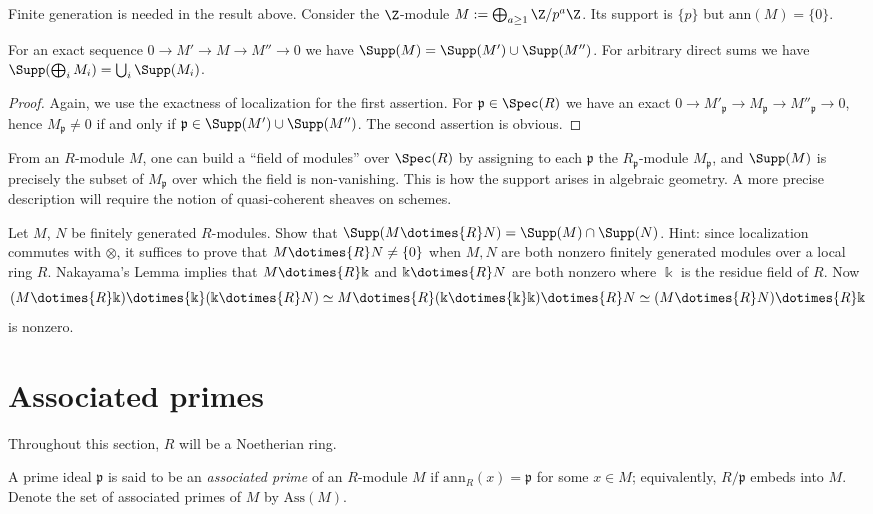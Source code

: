 Finite generation is needed in the result above. Consider the $\Z$-module $M := \bigoplus_{a \geq 1} \Z/p^a \Z$. Its support is $\{p\}$ but $\mathrm{ann}(M) = \{0\}$.

\begin{proposition}
	For an exact sequence $0 \to M' \to M \to M'' \to 0$ we have $\Supp(M) = \Supp(M') \cup \Supp(M'')$. For arbitrary direct sums we have $\Supp(\bigoplus_i M_i) = \bigcup_i \Supp(M_i)$.
\end{proposition}
\begin{proof}
	Again, we use the exactness of localization for the first assertion. For $\mathfrak{p} \in \Spec(R)$ we have an exact $0 \to M'_{\mathfrak{p}} \to M_{\mathfrak{p}} \to M''_{\mathfrak{p}} \to 0$, hence $M_{\mathfrak{p}} \neq 0$ if and only if $\mathfrak{p} \in \Supp(M') \cup \Supp(M'')$. The second assertion is obvious.
\end{proof}

From an $R$-module $M$, one can build a ``field of modules'' over $\Spec(R)$ by assigning to each $\mathfrak{p}$ the $R_{\mathfrak{p}}$-module $M_{\mathfrak{p}}$, and $\Supp(M)$ is precisely the subset of $M_{\mathfrak{p}}$ over which the field is non-vanishing. This is how the support arises in algebraic geometry. A more precise description will require the notion of quasi-coherent sheaves on schemes.

\begin{exercise}
	Let $M$, $N$ be finitely generated $R$-modules. Show that $\Supp(M \dotimes{R} N) = \Supp(M) \cap \Supp(N)$. Hint: since localization commutes with $\otimes$, it suffices to prove that $M \dotimes{R} N \neq \{0\}$ when $M, N$ are both nonzero finitely generated modules over a local ring $R$. Nakayama's Lemma implies that $M \dotimes{R} \Bbbk$ and $\Bbbk \dotimes{R} N$ are both nonzero where $\Bbbk$ is the residue field of $R$. Now
	\[ (M \dotimes{R} \Bbbk) \dotimes{\Bbbk} (\Bbbk \dotimes{R} N) \simeq M \dotimes{R} (\Bbbk \dotimes{\Bbbk} \Bbbk) \dotimes{R} N \simeq (M \dotimes{R} N) \dotimes{R} \Bbbk \]
	is nonzero.
\end{exercise}

\section{Associated primes}
Throughout this section, $R$ will be a Noetherian ring.

\begin{definition}
	A prime ideal $\mathfrak{p}$ is said to be an \emph{associated prime} of an $R$-module $M$ if $\text{ann}_R(x) = \mathfrak{p}$ for some $x \in M$; equivalently, $R/\mathfrak{p}$ embeds into $M$. Denote the set of associated primes of $M$ by $\text{Ass}(M)$.
\end{definition}

